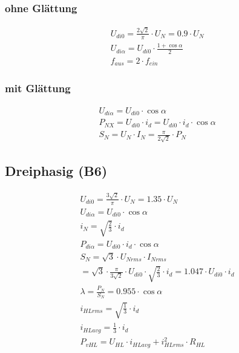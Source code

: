 \subsubsection{ohne Glättung}
\begin{gather*}
U_{di0} = \frac{2\sqrt{2}}{\pi} \cdot U_N = 0.9 \cdot U_N \\
U_{di\alpha} = U_{di0} \cdot \frac{1 + \cos\alpha}{2} \\
f_{aus} = 2 \cdot f_{ein}
\end{gather*}

\subsubsection{mit Glättung}
\begin{gather*}
U_{di\alpha} = U_{di0} \cdot \cos\alpha \\
P_{NX} = U_{di0} \cdot i_d = U_{di0} \cdot i_d \cdot \cos\alpha \\
S_N = U_N \cdot I_N = \frac{\pi}{2\sqrt{2}} \cdot P_N
\end{gather*}

\columnbreak
\subsection{Dreiphasig (B6)}
\begin{gather*}
U_{di0} = \frac{3\sqrt{2}}{\pi} \cdot U_N = 1.35 \cdot U_N \\
U_{di\alpha} = U_{di0} \cdot \cos\alpha \\
i_N = \sqrt{\frac{2}{3}} \cdot i_d \\
P_{di\alpha} = U_{di0} \cdot i_d \cdot \cos\alpha \\
S_N = \sqrt{3} \cdot U_{Nrms} \cdot I_{Nrms} \\
= \sqrt{3} \cdot \frac{\pi}{3\sqrt{2}} \cdot U_{di0} \cdot \sqrt{\frac{2}{3}} \cdot i_d = 1.047 \cdot U_{di0} \cdot i_d \\
\lambda = \frac{P_N}{S_N} = 0.955 \cdot \cos\alpha \\
i_{HLrms} = \sqrt{\frac{1}{3}} \cdot i_d \\
i_{HLavg} = \frac{1}{3} \cdot i_d \\
P_{vHL} = U_{HL} \cdot i_{HLavg} + i_{HLrms}^2 \cdot R_{HL}
\end{gather*}

\columnbreak
